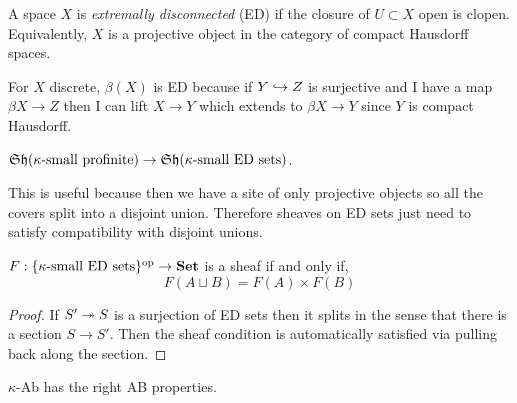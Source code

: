 \documentclass[12pt]{article}
\newcommand{\Set}{\mathbf{Set}}
\begin{document}
\begin{defn}
A space $X$ is \textit{extremally disconnected} (ED) if the closure of $U \subset X$ open is clopen. Equivalently, $X$ is a projective object in the category of compact Hausdorff spaces. 
\end{defn}

\begin{rmk}
For $X$ discrete, $\beta(X)$ is ED because if $Y \hookrightarrow Z$ is surjective and I have a map $\beta X \to Z$ then I can lift $X \to Y$ which extends to $\beta X \to Y$ since $Y$ is compact Hausdorff. 
\end{rmk}

\begin{cor}
$\mathfrak{Sh}(\kappa\text{-small profinite}) \to \mathfrak{Sh}(\kappa\text{-small ED sets})$.
\end{cor}

\begin{rmk}
This is useful because then we have a site of only projective objects so all the covers split into a disjoint union. Therefore sheaves on ED sets just need to satisfy compatibility with disjoint unions.
\end{rmk}

\begin{prop}
$F : \{ \kappa\text{-small ED sets} \}^\op \to \Set$ is a sheaf if and only if,
\[ F(A \sqcup B) = F(A) \times F(B) \] 
\end{prop}

\begin{proof}
If $S' \twoheadrightarrow S$ is a surjection of ED sets then it splits in the sense that there is a section $S \to S'$. Then the sheaf condition is automatically satisfied via pulling back along the section.
\end{proof}

\begin{theorem}
$\kappa$-Ab has the right AB properties.
\end{theorem}
\end{document}
